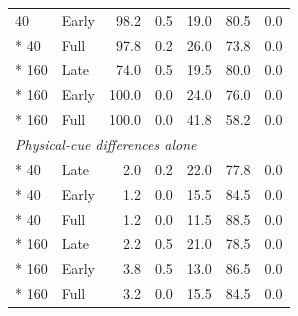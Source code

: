 \begin{longtable}{llrrrrr}
40 & Early & 98.2 & 0.5 & 19.0 & 80.5 & 0.0 \\*
40 & Full & 97.8 & 0.2 & 26.0 & 73.8 & 0.0 \\*
160 & Late & 74.0 & 0.5 & 19.5 & 80.0 & 0.0 \\*
160 & Early & 100.0 & 0.0 & 24.0 & 76.0 & 0.0 \\*
160 & Full & 100.0 & 0.0 & 41.8 & 58.2 & 0.0 \\
\multicolumn{7}{l}{\textit{Physical-cue differences alone}}\\*
40 & Late & 2.0 & 0.2 & 22.0 & 77.8 & 0.0 \\*
40 & Early & 1.2 & 0.0 & 15.5 & 84.5 & 0.0 \\*
40 & Full & 1.2 & 0.0 & 11.5 & 88.5 & 0.0 \\*
160 & Late & 2.2 & 0.5 & 21.0 & 78.5 & 0.0 \\*
160 & Early & 3.8 & 0.5 & 13.0 & 86.5 & 0.0 \\*
160 & Full & 3.2 & 0.0 & 15.5 & 84.5 & 0.0 \\
\bottomrule
\end{longtable}
